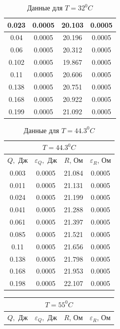 \documentclass[a4paper, 12pt]{article}%
\begin{document}
\begin{enumerate}
\begin{table}[h]
\begin{center}
\begin{tabular}{|c|c|c|c|}
0.023 & 0.0005 & 20.103 & 0.0005 \\ \hline
0.04 & 0.0005 & 20.196 & 0.0005 \\ \hline
0.06 & 0.0005 & 20.312 & 0.0005 \\ \hline
0.102 & 0.0005 & 19.867 & 0.0005 \\ \hline
0.11 & 0.0005 & 20.606 & 0.0005 \\ \hline
0.138 & 0.0005 & 20.751 & 0.0005 \\ \hline
0.168 & 0.0005 & 20.922 & 0.0005 \\ \hline
0.199 & 0.0005 & 21.092 & 0.0005 \\ \hline
\end{tabular}
\end{center}
\caption{Данные для $T = 32 ^0 C$}
\end{table}
\FloatBarrier
\begin{table}[h]
\begin{center}
\begin{tabular}{|c|c|c|c|}
\hline
\multicolumn{4}{|c|}{$T = 44.3 ^0 C$} \\ \hline
$Q,$ Дж & $\varepsilon_Q,$ Дж & $R$, Ом & $\varepsilon_R$, Ом \\ \hline
0.003 & 0.0005 & 21.084 & 0.0005 \\ \hline
0.011 & 0.0005 & 21.131 & 0.0005 \\ \hline
0.024 & 0.0005 & 21.199 & 0.0005 \\ \hline
0.041 & 0.0005 & 21.288 & 0.0005 \\ \hline
0.061 & 0.0005 & 21.397 & 0.0005 \\ \hline
0.085 & 0.0005 & 21.521 & 0.0005 \\ \hline
0.11 & 0.0005 & 21.656 & 0.0005 \\ \hline
0.138 & 0.0005 & 21.798 & 0.0005 \\ \hline
0.168 & 0.0005 & 21.953 & 0.0005 \\ \hline
0.198 & 0.0005 & 22.107 & 0.0005 \\ \hline
\end{tabular}
\end{center}
\caption{Данные для $T = 44.3 ^0 C$}
\end{table}
\FloatBarrier
\FloatBarrier
\begin{table}[h]
\begin{center}
\begin{tabular}{|c|c|c|c|}
\hline
\multicolumn{4}{|c|}{$T = 55 ^0 C$} \\ \hline
$Q,$ Дж & $\varepsilon_Q,$ Дж & $R$, Ом & $\varepsilon_R$, Ом \\ \hline

\end{tabular}
\end{center}
\end{table}
\end{enumerate}
\end{document}

